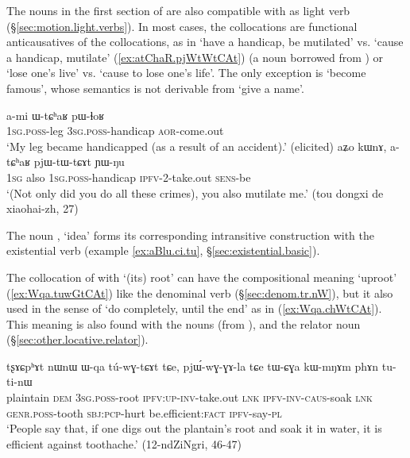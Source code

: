 The nouns in the first section of  are also compatible with  as light verb (§\ref{sec:motion.light.verbs}). In most cases, the  collocations are functional anticausatives of the  collocations, as in  `have a handicap, be mutilated' vs.  `cause a handicap, mutilate' (\ref{ex:atChaR.pjWtWtCAt}) (a noun borrowed from ) or  `lose one's live' vs.  `cause to lose one's life'. The only exception is  `become famous', whose semantics is not derivable from  `give a name'.

\begin{exe}
\ex 
\begin{xlist}
\ex \label{ex:WtChaR.pWlhoR}
\gll a-mi ɯ-tɕʰaʁ pɯ-ɬoʁ \\
\textsc{1sg}.\textsc{poss}-leg \textsc{3sg}.\textsc{poss}-handicap \textsc{aor}-come.out \\
\glt `My leg became handicapped (as a result of an accident).' (elicited)
\ex \label{ex:atChaR.pjWtWtCAt}
\gll aʑo kɯnɤ, a-tɕʰaʁ pjɯ-tɯ-tɕɤt ɲɯ-ŋu \\
\textsc{1sg} also \textsc{1sg}.\textsc{poss}-handicap \textsc{ipfv}-2-take.out \textsc{sens}-be \\
\glt `(Not only did you do all these crimes), you also mutilate me.' (tou dongxi de xiaohai-zh, 27)
\end{xlist}
\end{exe}

The noun , `idea' forms its corresponding intransitive construction with the existential verb  (example \ref{ex:aBlu.ci.tu}, §\ref{sec:existential.basic}).

The collocation of  with  `(its) root' can have the compositional meaning `uproot' (\ref{ex:Wqa.tuwGtCAt}) like the denominal verb (§\ref{sec:denom.tr.nW}), but it also used in the sense of `do completely, until the end' as in (\ref{ex:Wqa.chWtCAt}). This meaning is also found with the nouns  (from ),  and the relator noun  (§\ref{sec:other.locative.relator}).

\begin{exe}
\ex \label{ex:Wqa.tuwGtCAt}
\gll tʂɤɕpʰɤt nɯnɯ ɯ-qa tú-wɣ-tɕɤt tɕe, pjɯ́-wɣ-ɣɤ-la tɕe tɯ-ɕɣa kɯ-mŋɤm phɤn tu-ti-nɯ \\
plaintain \textsc{dem} \textsc{3sg}.\textsc{poss}-root \textsc{ipfv}:\textsc{up}-\textsc{inv}-take.out \textsc{lnk} \textsc{ipfv}-\textsc{inv}-\textsc{caus}-soak \textsc{lnk} \textsc{genr}.\textsc{poss}-tooth \textsc{sbj}:\textsc{pcp}-hurt be.efficient:\textsc{fact} \textsc{ipfv}-say-\textsc{pl} \\
\glt `People say that, if one digs out the plantain's root and soak it in water, it is efficient against toothache.' (12-ndZiNgri, 46-47)
\end{exe}


